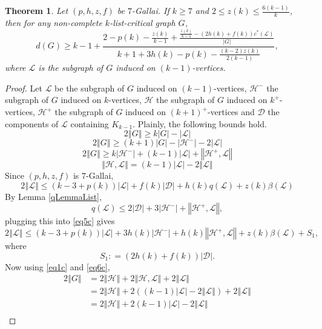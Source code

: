 \documentclass[10pt]{article}
\theoremstyle{plain}
\newtheorem{thm}{Theorem}[section]
\theoremstyle{definition}
\theoremstyle{remark}
\newcommand{\fancy}[1]{\mathcal{#1}}
\newcommand{\D}{\fancy{D}}
\renewcommand{\L}{\fancy{L}}
\newcommand{\HH}{\fancy{H}}
\newcommand{\card}[1]{\left|#1\right|}
\newcommand{\size}[1]{\left\Vert#1\right\Vert}
\newcommand{\parens}[1]{\left( #1 \right)}
\newcommand{\DefinedAs}{\mathrel{\mathop:}=}
\def\D{\fancy{D}}
\begin{document}
\begin{thm}\label{k7}
	Let $\parens{p,h,z,f}$ be $7$-Gallai.  If $k \ge 7$ and $2 \le z(k) \le \frac{6(k-1)}{k}$, then for any non-complete $k$-list-critical graph $G$,
	\[d(G) \ge k-1 + \frac{2 - p(k) - \frac{z(k)}{k-1} + \frac{\frac{z(k)}{k-1} - (2h(k) + f(k))c^*(\L)}{\card{G}}}{k+1 + 3h(k) - p(k) - \frac{(k-2)z(k)}{2(k-1)}},\]
	where $\L$ is the subgraph of $G$ induced on $(k-1)$-vertices.
\end{thm}
\begin{proof}
Let $\L$ be the subgraph of $G$ induced on $(k-1)$-vertices, $\HH^-$ the subgraph of $G$ induced on $k$-vertices, $\HH$ the subgraph of $G$ induced on $k^+$-vertices, 
$\HH^+$ the subgraph of $G$ induced on $(k+1)^+$-vertices and $\D$ the components of $\L$ containing $K_{k-1}$.
Plainly, the following bounds hold.
\begin{equation}\label{eq1c}
2\size{G} \ge k\card{G} - \card{\L}
\end{equation}
\begin{equation}\label{eq2c}
2\size{G} \ge (k+1)\card{G} - \card{\HH^-} - 2\card{\L}
\end{equation}
\begin{equation}\label{eq3c}
2\size{G} \ge k\card{\HH^-} + (k-1)\card{\L} + \size{\HH^+, \L}
\end{equation}
\begin{equation}\label{eq4c}
\size{\HH,\L} = (k-1)\card{\L} - 2\size{\L}
\end{equation}
Since $\parens{p,h,z,f}$ is $7$-Gallai,
\begin{equation}\label{eq5c}
2\size{\L} \le \parens{k-3 + p(k)}\card{\L} + f(k)\card{\D} + h(k)q(\L) + z(k)\beta(\L)
\end{equation}
By Lemma \ref{qLemmaList},
\[q(\L) \le 2\card{\D} + 3\card{\HH^-} + \size{\HH^+, \L},\]
plugging this into \eqref{eq5c} gives
\begin{equation}\label{eq6c}
2\size{\L} \le \parens{k-3 + p(k)}\card{\L} + 3h(k)\card{\HH^-} + h(k)\size{\HH^+, \L} + z(k)\beta(\L) + S_1,
\end{equation}
where
\[S_1 \DefinedAs (2h(k) + f(k))\card{\D}.\]
Now using \eqref{eq1c} and \eqref{eq6c},
\begin{align*}
	2\size{G} &= 2\size{\HH} + 2\size{\HH, \L} + 2\size{\L}\\
	&= 2\size{\HH} + 2((k-1)\card{\L} - 2\size{\L}) + 2\size{\L}\\
	&= 2\size{\HH} + 2(k-1)\card{\L} - 2\size{\L}\\

\end{align*}
\end{proof}
\end{document}
